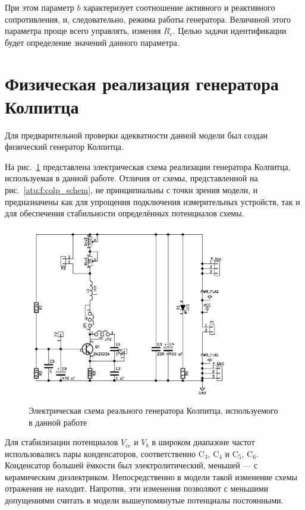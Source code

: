 При этом параметр $b$ характеризует соотношение
активного и реактивного сопротивления,
и, следовательно, режима работы генератора.
Величиной этого параметра проще всего управлять,
изменяя $R_c$.
Целью задачи идентификации  будет определение значений данного параметра.




\section{Физическая реализация генератора Колпитца} %

Для предварительной проверки адекватности данной модели
был создан физический генератор Колпитца.

На рис.~\ref{atu:f:colp_schem_real} представлена электрическая схема
реализации генератора Колпитца, используемая в данной работе.
Отличия от схемы,
представленной на рис.~\ref{atu:f:colp_schem},
не принципиальны с точки зрения модели,
и предназначены как для упрощения подключения
измерительных устройств, так и для
обеспечения стабильности определённых потенциалов схемы.

\begin{figure}[htb!]
\centerline{\includegraphics[width=0.8\textwidth]{p/colp_schem_real.png} }
\caption{Электрическая схема реального генератора Колпитца, используемого в данной работе}
\label{atu:f:colp_schem_real}
\end{figure}

Для стабилизации потенциалов $V_{cc}$ и $V_b$
в широком диапазоне частот использовались пары конденсаторов, соответственно
$\mathrm{C}_3$, $\mathrm{C}_4$ и
$\mathrm{C}_5$, $\mathrm{C}_6$. Конденсатор большей ёмкости
был электролитический, меньшей --- с керамическим диэлектриком.
Непосредственно в модели такой изменение схемы отражения не находит.
Напротив, эти изменения позволяют с меньшими допущениями считать
в модели вышеупомянутые потенциалы постоянными.

